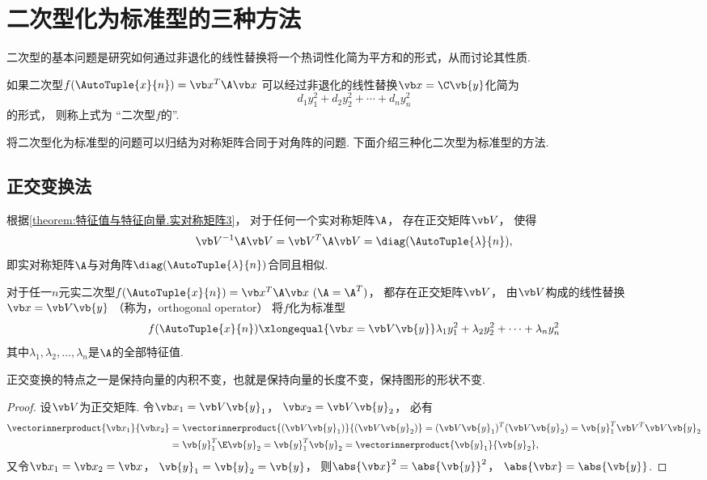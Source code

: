 \section{二次型化为标准型的三种方法}
二次型的基本问题是研究如何通过非退化的线性替换将一个热词性化简为平方和的形式，从而讨论其性质.
\begin{definition}
如果二次型\(f(\AutoTuple{x}{n})=\x^T\A\x\)
可以经过非退化的线性替换\(\x = \C \vb{y}\)化简为\[
	d_1 y_1^2 + d_2 y_2^2 + \dotsb + d_n y_n^2
\]的形式，
则称上式为
“二次型\(f\)的”.
\end{definition}
将二次型化为标准型的问题可以归结为对称矩阵合同于对角阵的问题.
下面介绍三种化二次型为标准型的方法.

\subsection{正交变换法}
根据\cref{theorem:特征值与特征向量.实对称矩阵3}，
对于任何一个实对称矩阵\(\A\)，
存在正交矩阵\(\Q\)，
使得\[
	\Q^{-1}\A\Q = \Q^T\A\Q = \diag(\AutoTuple{\lambda}{n}),
\]
即实对称矩阵\(\A\)与对角阵\(\diag(\AutoTuple{\lambda}{n})\)合同且相似.

\begin{theorem}
对于任一\(n\)元实二次型\(f(\AutoTuple{x}{n})=\x^T\A\x\ (\A=\A^T)\)，
都存在正交矩阵\(\Q\)，
由\(\Q\)构成的线性替换\(\x=\Q\vb{y}\)
（称为，{\rm orthogonal operator}）
将\(f\)化为标准型\[
	f(\AutoTuple{x}{n})
	\xlongequal{\x=\Q\vb{y}}
	\lambda_1y_1^2+\lambda_2y_2^2+ \dotsb +\lambda_ny_n^2
\]
其中\(\lambda_1,\lambda_2,\dotsc,\lambda_n\)是\(\A\)的全部特征值.
\end{theorem}

\begin{corollary}
正交变换的特点之一是保持向量的内积不变，也就是保持向量的长度不变，保持图形的形状不变.
\begin{proof}
设\(\Q\)为正交矩阵.
令\(\x_1=\Q\vb{y}_1\)，
\(\x_2=\Q\vb{y}_2\)，
必有\begin{align*}
	\vectorinnerproduct{\x_1}{\x_2}
	&=\vectorinnerproduct{(\Q\vb{y}_1)}{(\Q\vb{y}_2)}
	=(\Q\vb{y}_1)^T (\Q\vb{y}_2)
	=\vb{y}_1^T \Q^T \Q \vb{y}_2 \\
	&=\vb{y}_1^T \E \vb{y}_2
	=\vb{y}_1^T \vb{y}_2
	=\vectorinnerproduct{\vb{y}_1}{\vb{y}_2},
\end{align*}
又令\(\x_1=\x_2=\x\)，
\(\vb{y}_1=\vb{y}_2=\vb{y}\)，
则\(\abs{\x}^2=\abs{\vb{y}}^2\)，
\(\abs{\x}=\abs{\vb{y}}\).
\end{proof}
\end{corollary}

